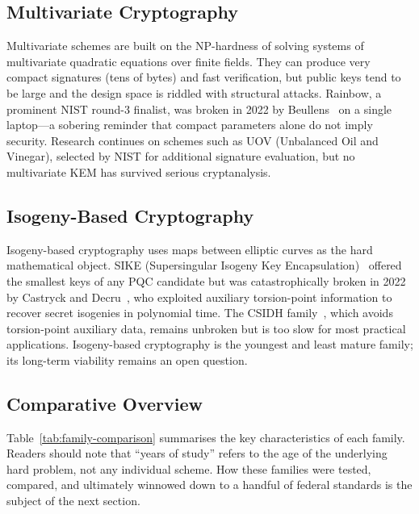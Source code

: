 \subsection{Multivariate Cryptography}
\label{subsec:family-multivariate}

Multivariate schemes are built on the NP-hardness of solving systems of multivariate quadratic equations over finite fields.  They can produce very compact signatures (tens of bytes) and fast verification, but public keys tend to be large and the design space is riddled with structural attacks.  Rainbow, a prominent NIST round-3 finalist, was broken in 2022 by Beullens~\cite{Beullens2022} on a single laptop---a sobering reminder that compact parameters alone do not imply security.  Research continues on schemes such as UOV (Unbalanced Oil and Vinegar), selected by NIST for additional signature evaluation, but no multivariate KEM has survived serious cryptanalysis.

\subsection{Isogeny-Based Cryptography}
\label{subsec:family-isogeny}

Isogeny-based cryptography uses maps between elliptic curves as the hard mathematical object.  SIKE (Supersingular Isogeny Key Encapsulation)~\cite{JaoDeFeo2011} offered the smallest keys of any PQC candidate but was catastrophically broken in 2022 by Castryck and Decru~\cite{CastryckDecru2023}, who exploited auxiliary torsion-point information to recover secret isogenies in polynomial time.  The CSIDH family~\cite{CSIDH2018}, which avoids torsion-point auxiliary data, remains unbroken but is too slow for most practical applications.  Isogeny-based cryptography is the youngest and least mature family; its long-term viability remains an open question.

\subsection{Comparative Overview}
\label{subsec:family-comparison}

Table~\ref{tab:family-comparison} summarises the key characteristics of each family.  Readers should note that ``years of study'' refers to the age of the underlying hard problem, not any individual scheme.  How these families were tested, compared, and ultimately winnowed down to a handful of federal standards is the subject of the next section.

